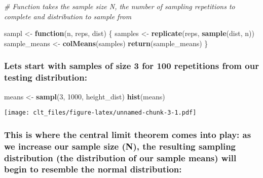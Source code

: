 \documentclass[
]{article}
\newenvironment{Shaded}{\begin{snugshade}}{\end{snugshade}}
\newcommand{\CommentTok}[1]{\textcolor[rgb]{0.56,0.35,0.01}{\textit{#1}}}
\newcommand{\ControlFlowTok}[1]{\textcolor[rgb]{0.13,0.29,0.53}{\textbf{#1}}}
\newcommand{\DecValTok}[1]{\textcolor[rgb]{0.00,0.00,0.81}{#1}}
\newcommand{\KeywordTok}[1]{\textcolor[rgb]{0.13,0.29,0.53}{\textbf{#1}}}
\newcommand{\NormalTok}[1]{#1}
\newcommand{\StringTok}[1]{\textcolor[rgb]{0.31,0.60,0.02}{#1}}
\begin{document}
\begin{Shaded}
\begin{Highlighting}[]
\CommentTok{# Function takes the sample size N, the number of sampling repetitions to complete and distribution to sample from}

\NormalTok{sampl <-}\StringTok{ }\ControlFlowTok{function}\NormalTok{(n, reps, dist) \{}
\NormalTok{  samples <-}\StringTok{ }\KeywordTok{replicate}\NormalTok{(reps, }\KeywordTok{sample}\NormalTok{(dist, n))}
\NormalTok{  sample_means <-}\StringTok{ }\KeywordTok{colMeans}\NormalTok{(samples)}
  \KeywordTok{return}\NormalTok{(sample_means)}
\NormalTok{\}}
\end{Highlighting}
\end{Shaded}

\hypertarget{lets-start-with-samples-of-size-3-for-100-repetitions-from-our-testing-distribution}{%
\subsubsection{Lets start with samples of size 3 for 100 repetitions
from our testing
distribution:}\label{lets-start-with-samples-of-size-3-for-100-repetitions-from-our-testing-distribution}}

\begin{Shaded}
\begin{Highlighting}[]
\NormalTok{means <-}\StringTok{ }\KeywordTok{sampl}\NormalTok{(}\DecValTok{3}\NormalTok{, }\DecValTok{1000}\NormalTok{, height_dist)}
\KeywordTok{hist}\NormalTok{(means)}
\end{Highlighting}
\end{Shaded}

\texttt{[image: clt\_files/figure-latex/unnamed-chunk-3-1.pdf]}

\hypertarget{this-is-where-the-central-limit-theorem-comes-into-play-as-we-increase-our-sample-size-n-the-resulting-sampling-distribution-the-distribution-of-our-sample-means-will-begin-to-resemble-the-normal-distribution}{%
\subsubsection{This is where the central limit theorem comes into play:
as we increase our sample size (N), the resulting sampling distribution
(the distribution of our sample means) will begin to resemble the normal
distribution:}\label{this-is-where-the-central-limit-theorem-comes-into-play-as-we-increase-our-sample-size-n-the-resulting-sampling-distribution-the-distribution-of-our-sample-means-will-begin-to-resemble-the-normal-distribution}}
\end{document}

